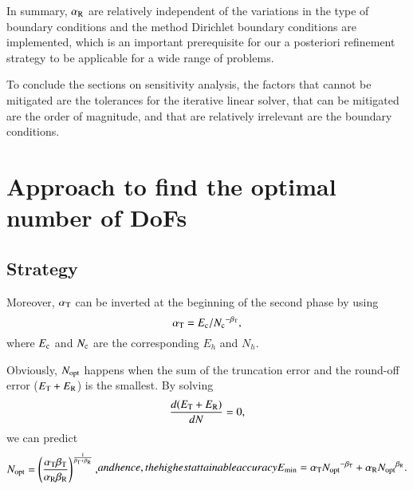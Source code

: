 \documentclass[review,3p]{elsarticle}
\begin{document}
In summary, $\alpha_{\rm R}$ are relatively independent of the variations in the type of boundary conditions and the method Dirichlet boundary conditions are implemented, which is an important prerequisite for our a posteriori refinement strategy to be applicable for a wide range of problems.

To conclude the sections on sensitivity analysis, the factors that cannot be mitigated are the tolerances for the iterative linear solver, that can be mitigated are the order of magnitude, and that are relatively irrelevant are the boundary conditions.

\section{Approach to find the optimal number of DoFs}                 \label{approach_finding_optimal_number_of_DoFs}

\subsection{Strategy}           \label{section_strategy}

Moreover, $\alpha_{\rm T}$ can be inverted at the beginning of the second phase by using
\begin{equation}
 \alpha_{\rm T} = {E_{\rm c}}/{N_{\rm c}}^{- \beta_{\rm T}},		\label{formula_offset_truncation_error}
\end{equation}
where ${E_{\rm c}}$ and ${N_{\rm c}}$ are the corresponding $E_h$ and $N_h$.


Obviously, $N_{\rm opt}$ happens when the sum of the truncation error and the round-off error ($E_{\rm T}+E_{\rm R}$) is the smallest. By solving
\begin{equation}
    \frac{d(E_{\rm T}+E_{\rm R})}{dN}=0,    \label{derivative_condition_N_opt}
\end{equation}
we can predict
\begin{subequations}
\begin{align}
 N_{\rm opt} = \left( \frac{\alpha_{\rm T} \beta_{\rm T}}{\alpha _{\rm R} \beta_{\rm R}} \right)^{\frac{1}{\beta_{\rm T} + \beta_{\rm R}}},
\end{align}
and hence, the highest attainable accuracy
\begin{align}
 E_{\rm min} = \alpha_{\rm T} {N_{\rm opt}}^{- {\beta _{\rm T}}}+\alpha_{\rm R} {N_{\rm opt}}^{{\beta _{\rm R}}}.
\end{align}
\end{subequations}
\end{document}
